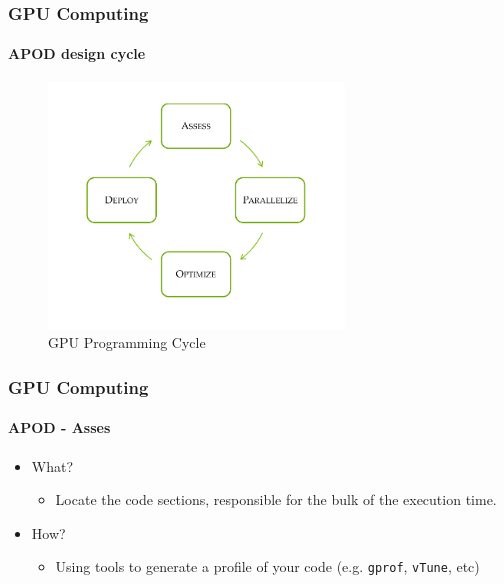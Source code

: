 \begin{frame}
    \frametitle{GPU Computing}
    \framesubtitle{APOD design cycle}
    \begin{figure}
        \centering
        \label{fig:apod}
        \includegraphics[width=0.7\textwidth]{img/apod}
        \caption{GPU Programming Cycle}
    \end{figure}
\end{frame}

\begin{frame}
    \frametitle{GPU Computing}
    \framesubtitle{APOD - Asses}
    \begin{itemize}
        \item What?
        \begin{itemize}
            \item Locate the code sections, responsible for the bulk of the execution time.
        \end{itemize}
        \item How?
        \begin{itemize}
            \item Using tools to generate a profile of your code (e.g. \texttt{gprof}, \texttt{vTune}, etc)
        \end{itemize}
    \end{itemize}
\end{frame}

